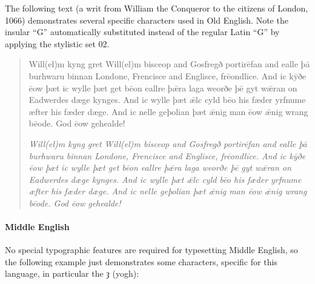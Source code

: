 \documentclass[12pt,a4paper,openany]{book}
\begin{document}
The following text (a writ from William the Conqueror to the citizens of
London, 1066) demonstrates several specific characters used in Old English.
Note the insular “G” automatically substituted instead of the regular Latin
“G” by applying the stylistic set 02.

\begin{quote}
\large

Will(el)m kyng gret Will(el)m bisceop and Gosfregð portirēfan and ealle þā
burhwaru binnan Londone, Frencisce and Englisce, frēond\-līce. And ic kȳðe ēow
þæt ic wylle þæt get bēon eallre þǣra laga weorðe þē gyt wǣran on Eadwerdes
dæge kynges. And ic wylle þæt ǣlc cyld bēo his fæder yrfnume æfter his
fæder dæge. And ic nelle geþolian þæt ǣnig man ēow ǣnig wrang bēode. God
ēow gehealde!

\smallskip

\itshape
Will(el)m kyng gret Will(el)m bisceop and Gosfregð portirēfan and ealle þā
burhwaru binnan Londone, Frencisce and Englisce, frēond\-līce. And ic kȳðe ēow
þæt ic wylle þæt get bēon eallre þǣra laga weorðe þē gyt wǣran on Eadwerdes
dæge kynges. And ic wylle þæt ǣlc cyld bēo his fæder yrfnume æfter his
fæder dæge. And ic nelle geþolian þæt ǣnig man ēow ǣnig wrang bēode. God
ēow gehealde!

\end{quote}

\paragraph{Middle English}

No special typographic features are required for typesetting Middle
English, so the following example just demonstrates some characters,
specific for this language, in particular the \textit{ȝ} (yogh):
\end{document}
